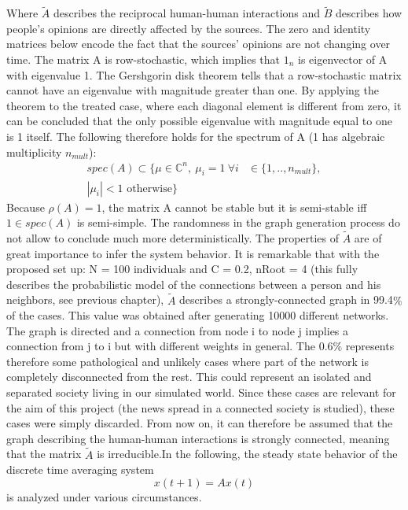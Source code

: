 Where $\tilde{A}$ describes the reciprocal human-human interactions and $\tilde{B}$ describes how people's opinions are directly affected by the sources. The zero and identity matrices below encode the fact that the sources' opinions are not changing over time. \newline
The matrix A is row-stochastic, which implies that $1_n$ is eigenvector of A with eigenvalue 1. The Gershgorin disk theorem tells that a row-stochastic matrix cannot have an eigenvalue with magnitude greater than one. By applying the theorem to the treated case, where each diagonal element is different from zero, it can be concluded that the only possible eigenvalue with magnitude equal to one is 1 itself. The following therefore holds for the spectrum of A (1 has algebraic multiplicity $n_{mult}$):
\begin{align*}
spec(A) \subset \{\mu \in \mathbb{C}^n,\ \mu_i = 1\ \forall i & \in \{1,..,n_{mult}\},\\
| \mu_i | < 1 \text{ otherwise}\}
\end{align*}
Because $\rho(A) = 1$, the matrix A cannot be stable but it is semi-stable iff $1 \in spec(A)$ is semi-simple. \newline
The randomness in the graph generation process do not allow to conclude much more deterministically. The properties of $\tilde{A}$ are of great importance to infer the system behavior. It is remarkable that with the proposed set up: N = 100 individuals and C = 0.2, nRoot = 4 (this fully describes the probabilistic model of the connections between a person and his neighbors, see previous chapter), $\tilde{A}$ describes a strongly-connected graph in 99.4$\%$ of the cases. This value was obtained after generating 10000 different networks. The graph is directed and a connection from node i to node j implies a connection from j to i but with different weights in general. The 0.6$\%$ represents therefore some pathological and unlikely cases where part of the network is completely disconnected from the rest. This could represent an isolated and separated society living in our simulated world. Since these cases are relevant for the aim of this project (the news spread in a connected society is studied), these cases were simply discarded. From now on, it can therefore be assumed that the graph describing the human-human interactions is strongly connected, meaning that the matrix $\tilde{A}$ is irreducible.\newline In the following, the steady state behavior of the discrete time averaging system 
$$
x(t+1) = Ax(t)
$$
is analyzed under various circumstances.
